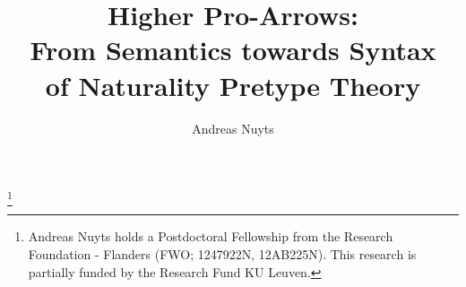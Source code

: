 \documentclass{lmcs} %
\theoremstyle{plain}\newtheorem{satz}[thm]{Satz} %
\theoremstyle{plain}
\theoremstyle{definition}
\begin{document}
\title[Higher Pro-Arrows: From Sem.\ towards Syntax of Naturality Pretype Theory]{Higher Pro-Arrows: \\ From Semantics towards Syntax \\ of Naturality Pretype Theory}

\author[Andreas Nuyts]{Andreas Nuyts}	%
\thanks{Andreas Nuyts holds a Postdoctoral Fellowship from the Research Foundation - Flanders (FWO; 1247922N, 12AB225N). This research is partially funded by the Research Fund KU Leuven.}	%

\address{DistriNet, KU Leuven, Belgium}	%





\end{document}
